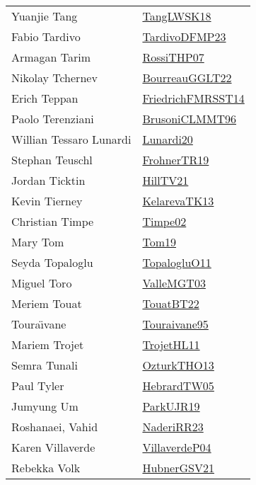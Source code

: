 {\begin{longtable}{p{4cm}p{20cm}}
Yuanjie Tang & \href{}{TangLWSK18}\cite{TangLWSK18} \\
Fabio Tardivo & \href{papers/TardivoDFMP23.pdf}{TardivoDFMP23}\cite{TardivoDFMP23} \\
Armagan Tarim & \href{papers/RossiTHP07.pdf}{RossiTHP07}\cite{RossiTHP07} \\
Nikolay Tchernev & \href{articles/BourreauGGLT22.pdf}{BourreauGGLT22}\cite{BourreauGGLT22} \\
Erich Teppan & \href{}{FriedrichFMRSST14}\cite{FriedrichFMRSST14} \\
Paolo Terenziani & \href{papers/BrusoniCLMMT96.pdf}{BrusoniCLMMT96}\cite{BrusoniCLMMT96} \\
Willian Tessaro Lunardi & \href{}{Lunardi20}\cite{Lunardi20} \\
Stephan Teuschl & \href{papers/FrohnerTR19.pdf}{FrohnerTR19}\cite{FrohnerTR19} \\
Jordan Ticktin & \href{papers/HillTV21.pdf}{HillTV21}\cite{HillTV21} \\
Kevin Tierney & \href{papers/KelarevaTK13.pdf}{KelarevaTK13}\cite{KelarevaTK13} \\
Christian Timpe & \href{articles/Timpe02.pdf}{Timpe02}\cite{Timpe02} \\
Mary Tom & \href{papers/Tom19.pdf}{Tom19}\cite{Tom19} \\
Seyda Topaloglu & \href{articles/TopalogluO11.pdf}{TopalogluO11}\cite{TopalogluO11} \\
Miguel Toro & \href{papers/ValleMGT03.pdf}{ValleMGT03}\cite{ValleMGT03} \\
Meriem Touat & \href{papers/TouatBT22.pdf}{TouatBT22}\cite{TouatBT22} \\
Toura{\"{\i}}vane & \href{papers/Touraivane95.pdf}{Touraivane95}\cite{Touraivane95} \\
Mariem Trojet & \href{articles/TrojetHL11.pdf}{TrojetHL11}\cite{TrojetHL11} \\
Semra Tunali & \href{articles/OzturkTHO13.pdf}{OzturkTHO13}\cite{OzturkTHO13} \\
Paul Tyler & \href{papers/HebrardTW05.pdf}{HebrardTW05}\cite{HebrardTW05} \\
Jumyung Um & \href{papers/ParkUJR19.pdf}{ParkUJR19}\cite{ParkUJR19} \\
Roshanaei, Vahid & \href{articles/NaderiRR23.pdf}{NaderiRR23}\cite{NaderiRR23} \\
Karen Villaverde & \href{}{VillaverdeP04}\cite{VillaverdeP04} \\
Rebekka Volk & \href{articles/HubnerGSV21.pdf}{HubnerGSV21}\cite{HubnerGSV21} \\

\end{longtable}}
